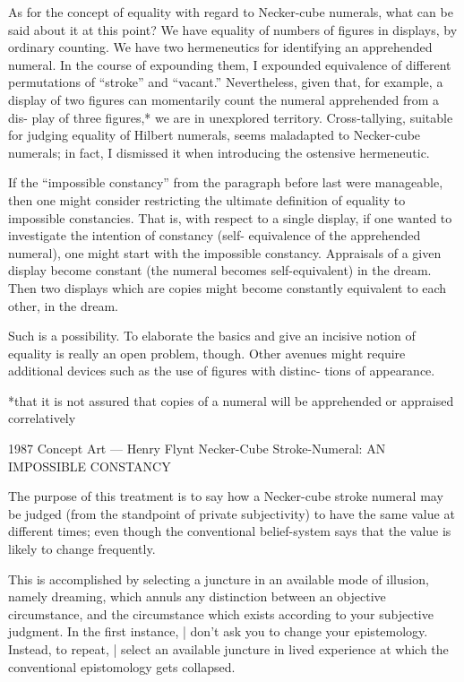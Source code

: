 As for the concept of equality with regard to Necker-cube numerals, 
what can be said about it at this point? We have equality of numbers of 
figures in displays, by ordinary counting. We have two hermeneutics 
for identifying an apprehended numeral. In the course of expounding 
them, I expounded equivalence of different permutations of “stroke” 
and “vacant.” Nevertheless, given that, for example, a display of two 
figures can momentarily count the numeral apprehended from a dis- 
play of three figures,* we are in unexplored territory. Cross-tallying, 
suitable for judging equality of Hilbert numerals, seems maladapted to 
Necker-cube numerals; in fact, I dismissed it when introducing the 
ostensive hermeneutic. 

If the “impossible constancy” from the paragraph before last were 
manageable, then one might consider restricting the ultimate definition 
of equality to impossible constancies. That is, with respect to a single 
display, if one wanted to investigate the intention of constancy (self- 
equivalence of the apprehended numeral), one might start with the 
impossible constancy. Appraisals of a given display become constant 
(the numeral becomes self-equivalent) in the dream. Then two displays 
which are copies might become constantly equivalent to each other, in 
the dream. 

Such is a possibility. To elaborate the basics and give an incisive 
notion of equality is really an open problem, though. Other avenues 
might require additional devices such as the use of figures with distinc- 
tions of appearance. 


*that it is not assured that copies of a numeral will be apprehended or 
appraised correlatively 


1987 Concept Art — Henry Flynt 
Necker-Cube Stroke-Numeral: AN IMPOSSIBLE CONSTANCY 


The purpose of this treatment is to say how a Necker-cube stroke numeral may be 
judged (from the standpoint of private subjectivity) to have the same value at different 
times; even though the conventional belief-system says that the value is likely to change 
frequently. 


This is accomplished by selecting a juncture in an available mode of illusion, namely 
dreaming, which annuls any distinction between an objective circumstance, and the 
circumstance which exists according to your subjective judgment. In the first instance, | 
don’t ask you to change your epistemology. Instead, to repeat, | select an available juncture 
in lived experience at which the conventional epistomology gets collapsed. 


